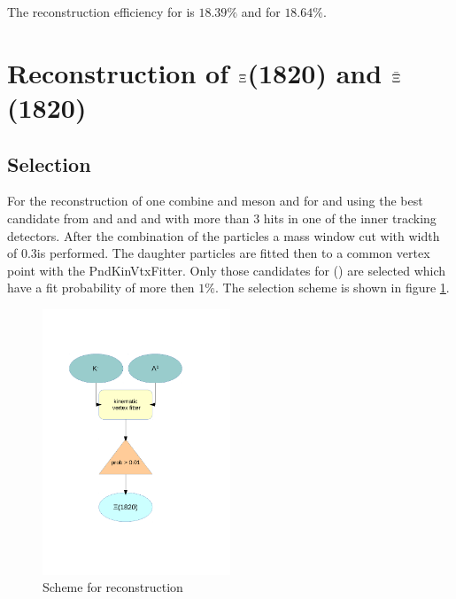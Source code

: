 		The reconstruction efficiency for \anticascade is $18.39\%$ and for \cascade $18.64\%$.
		
	
	
	

\section{Reconstruction of $\boldmath{\Xi}$(1820) and $\boldmath{\bar{\Xi}}$(1820)}
		\subsection*{Selection}

		For the reconstruction of \excitedcascade one combine \lam and \kminus meson and for \excitedanticascade \alam and \kplus using the
		best candidate from \lam and \alam and \kplus and \kminus with more than 3 hits in one of the inner tracking detectors.
		After the combination of the particles a mass window cut with width of $0.3$\massunit is performed. 
		The daughter particles are fitted then to a common vertex point with the PndKinVtxFitter.
		Only those candidates for \excitedcascade (\excitedanticascade) are selected which have a fit probability of more then $1\%$.
		The selection scheme is shown in figure \ref{fig:excitedcascade_scheme}. 
		
		\begin{figure}
			\centering
				\includegraphics[width=0.50\textwidth]{./plots/combineExcitedCascade.pdf}
			\caption{\propose Scheme for \excitedcascade reconstruction}
			\label{fig:excitedcascade_scheme}
		\end{figure}
		
